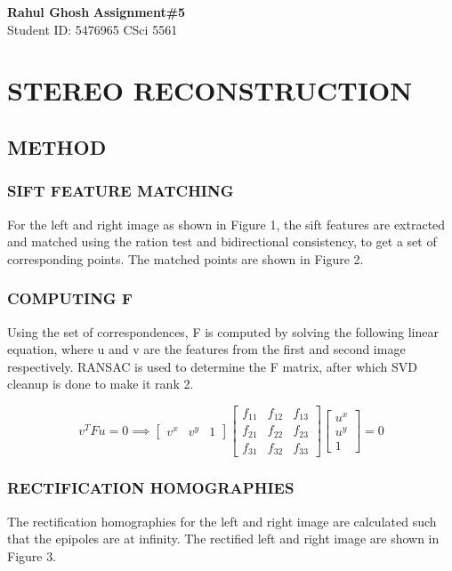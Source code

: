 \documentclass[letter, 10pt]{article}
\begin{document}
\noindent
\large \textbf{Rahul Ghosh} \hfill \textbf{Assignment\#5}\\
\normalsize Student ID: 5476965 \hfill CSci 5561\\

\section*{\centering STEREO RECONSTRUCTION}

\subsection*{METHOD}
\subsubsection*{SIFT FEATURE MATCHING}
For the left and right image as shown in Figure 1, the sift features are extracted and matched using the ration test and bidirectional consistency, to get a set of corresponding points. The matched points are shown in Figure 2.

\subsubsection*{COMPUTING F}
Using the set of correspondences, F is computed by solving the following linear equation, where u and v are the features from the first and second image respectively. RANSAC is used to determine the F matrix, after which SVD cleanup is done to make it rank 2.

\begin{equation*}
    v^TFu = 0 \implies 
    \begin{bmatrix}
        v^x & v^y & 1
    \end{bmatrix}
    \begin{bmatrix}
        f_{11} & f_{12} & f_{13}\\
        f_{21} & f_{22} & f_{23}\\
        f_{31} & f_{32} & f_{33}
    \end{bmatrix}
    \begin{bmatrix}
        u^x\\
        u^y\\
        1
    \end{bmatrix}
    = 0
\end{equation*}

\subsubsection*{RECTIFICATION HOMOGRAPHIES}
The rectification homographies for the left and right image are calculated such that the epipoles are at infinity. The rectified left and right image are shown in Figure 3.
\end{document}
